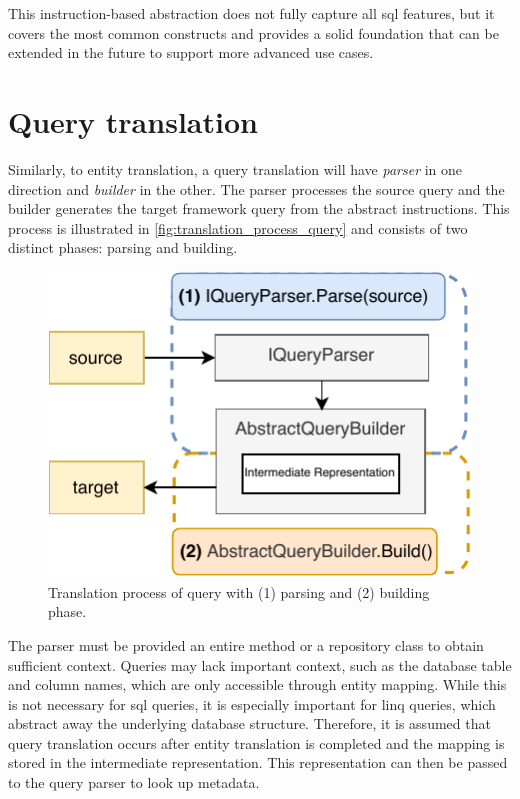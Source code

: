 This instruction-based abstraction does not fully capture all \acrshort{sql} features, but it covers the most common constructs and provides a solid foundation that can be extended in the future to support more advanced use cases. 

\section{Query translation}
Similarly, to entity translation, a query translation will have \textit{parser} in one direction and \textit{builder} in the other. The parser processes the source query and the builder generates the target framework query from the abstract instructions. This process is illustrated in \autoref{fig:translation_process_query} and consists of two distinct phases: parsing and building.

\begin{figure}[H]
  \centering
  \includegraphics[scale=1]{thesis/img/thesis/05_translate_process_queries.drawio.pdf}
  \caption{Translation process of query with (1) parsing and (2) building phase.}
  \label{fig:translation_process_query}
\end{figure}

The parser must be provided an entire method or a repository class to obtain sufficient context. Queries may lack important context, such as the database table and column names, which are only accessible through entity mapping. While this is not necessary for \acrshort{sql} queries, it is especially important for \acrshort{linq} queries, which abstract away the underlying database structure. Therefore, it is assumed that query translation occurs after entity translation is completed and the mapping is stored in the intermediate representation. This representation can then be passed to the query parser to look up metadata.

